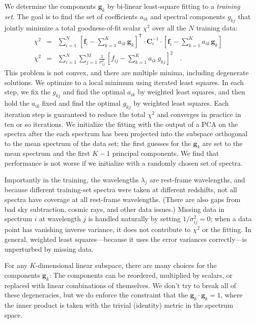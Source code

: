 \documentclass[apj]{emulateapj}
\newcommand{\mmatrix}[1]{\boldsymbol{#1}}
\newcommand{\inverse}[1]{{#1}^{-1}}
\newcommand{\transpose}[1]{{#1}^{\mathsf{T}}}
\newcommand{\covar}{\mmatrix{C}}
\newcommand{\fvec}{\mmatrix{f}}
\newcommand{\gvec}{\mmatrix{g}}
\newcommand{\invvar}{\inverse{\covar}}
\begin{document}
We determine the components $\gvec_k$ by bi-linear least-square
fitting to a \emph{training set}.  The goal is to find the set of
coefficients $a_{ik}$ and spectral components $g_{kj}$ that jointly
minimize a total goodness-of-fit scalar $\chi^2$ over all the $N$
training data:
\begin{eqnarray}\displaystyle
\chi^2 &=& \sum_{i=1}^N 
 \,\transpose{\left[\fvec_i - \sum_{k=1}^K a_{ik}\,\gvec_k\right]}
 \cdot\invvar_i\cdot\left[\fvec_i - \sum_{k=1}^K a_{ik}\,\gvec_k\right]
 \nonumber\\
\chi^2 &=& \sum_{i=1}^N \sum_{j=1}^M \frac{1}{\sigma^2_{ij}}
 \,\left[f_{ij} - \sum_{k=1}^K a_{ik}\,g_{kj}\right]^2
\quad .
\end{eqnarray}
This problem is not convex, and there are multiple minima, including
degenerate solutions.  We optimize to a local minimum using iterated
least squares.  In each step, we fix the $g_{kj}$ and find the optimal
$a_{ik}$ by weighted least squares, and then hold the $a_{ik}$ fixed
and find the optimal $g_{kj}$ by weighted least squares.  Each
iteration step is guaranteed to reduce the total $\chi^2$ and
converges in practice in ten or so iterations.  We initialize the
fitting with the output of a PCA on the spectra after the each
spectrum has been projected into the subspace orthogonal to the mean
spectrum of the data set; the first guesses for the $\gvec_k$ are set
to the mean spectrum and the first $K-1$ principal components.  We
find that performance is not worse if we initialize with a randomly
chosen set of spectra.

Importantly in the training, the wavelengths $\lambda_j$ are
rest-frame wavelengths, and because different training-set spectra
were taken at different redshifts, not all spectra have coverage at
all rest-frame wavelengths.  (There are also gaps from bad sky
subtraction, cosmic rays, and other data issues.)  Missing data in
spectrum $i$ at wavelength $j$ is handled naturally by setting
$1/\sigma^2_{ij}=0$; when a data point has vanishing inverse
variance, it does not contribute to $\chi^2$ or the fitting.  In
general, weighted least squares---because it uses the error variances
correctly---is unperturbed by missing data.

For any $K$-dimensional linear subspace, there are many choices for
the components $\gvec_k$: The components can be reordered, multiplied
by scalars, or replaced with linear combinations of themselves.  We
don't try to break all of these degeneracies, but we do enforce the
constraint that the $\gvec_k\cdot\gvec_k=1$, where the inner product
is taken with the trivial (identity) metric in the spectrum space.
\end{document}
